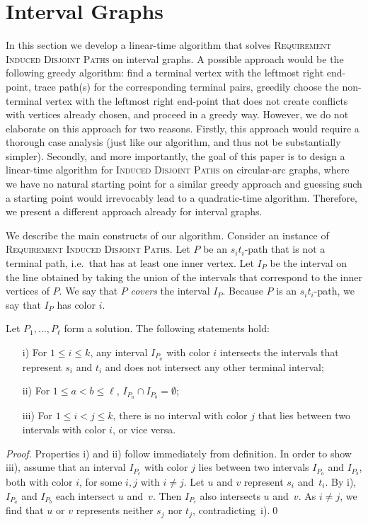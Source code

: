 \documentclass{llncs}
\newcommand{\ie}{i.e.~}
\newcommand{\problemIDP}{\textsc{Induced Disjoint Paths}}
\newcommand{\problemRIDP}{\textsc{Requirement Induced Disjoint Paths}}
\begin{document}
\section{Interval Graphs}\label{s-int}
In this section we develop a linear-time algorithm that solves \problemRIDP{} on interval graphs. A possible approach would be the following greedy algorithm: find a terminal vertex with the leftmost right end-point, trace path(s) for the corresponding terminal pairs, greedily choose the non-terminal vertex with the leftmost right end-point that does not create conflicts with vertices already chosen, and proceed in a greedy way. However, we do not elaborate on this approach for two reasons. Firstly, this approach would require a thorough case analysis (just like our algorithm, and thus not be substantially simpler). Secondly, and more importantly, the goal of this paper is to design a linear-time algorithm for \problemIDP{} on circular-arc graphs, where we have no natural starting point for a similar greedy approach and guessing such a starting point would irrevocably lead to a quadratic-time algorithm. Therefore, we present a different approach already for interval graphs.

We describe the main constructs of our algorithm. Consider an instance  of \problemRIDP{}.
Let $P$ be an $s_it_i$-path that is not a terminal path, \ie that has at least one inner vertex. 
Let $I_P$ be the interval on the line obtained by taking the union of the intervals that correspond to the inner vertices of $P$. We say that $P$ \emph{covers} the interval $I_P$. Because $P$ is an $s_it_i$-path, we say that $I_{P}$ has color $i$.

\begin{lemma}\label{l-cover}
Let $P_1,\ldots, P_\ell$ form a solution. The following statements hold:
\begin{itemize}
\item[i)] For $1\leq i\leq k$, any interval $I_{P_a}$ with color $i$ intersects the intervals that represent $s_{i}$ and $t_{i}$ and does not intersect any other terminal interval;
\item[ii)] For $1\leq a<b\leq \ell$, $I_{P_a}\cap I_{P_b}=\emptyset$;
\item[iii)] For $1\leq i<j \leq k$, there is no interval with color $j$ that lies between two intervals with color $i$, or vice versa.
\end{itemize}
\end{lemma}

\begin{proof}
Properties i) and ii) follow immediately from definition. In order to show iii), assume that an interval $I_{P_c}$ with color $j$
lies between two intervals $I_{P_a}$ and $I_{P_b}$, both with color $i$, for some $i,j$ with $i\neq j$.
Let $u$ and $v$ represent $s_i$ and~$t_i$. By i), $I_{P_a}$ and $I_{P_b}$ each intersect $u$ and~$v$. 
Then $I_{P_c}$ also intersects $u$ and~$v$. As $i\neq j$, we find that $u$ or $v$ represents neither 
$s_j$ nor $t_j$, contradicting~i).\qed  
\end{proof}
\end{document}

